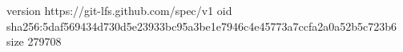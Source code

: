 version https://git-lfs.github.com/spec/v1
oid sha256:5daf569434d730d5e23933bc95a3be1e7946c4e45773a7ccfa2a0a52b5c723b6
size 279708
